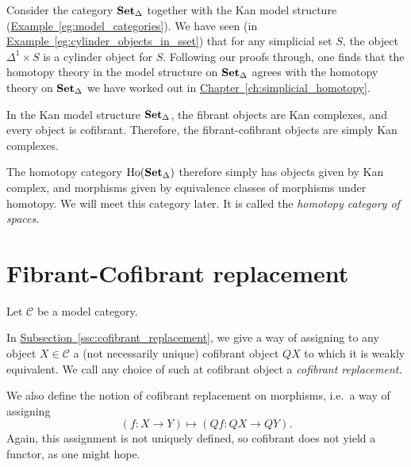 \documentclass[main.tex]{subfiles}
\begin{document}
\begin{example}
  Consider the category $\operatorname{\mathbf{Set}_{\Delta}}$ together with the Kan model structure (\hyperref[eg:model_categories]{Example~\ref*{eg:model_categories}}). We have seen (in \hyperref[eg:cylinder_objects_in_sset]{Example~\ref*{eg:cylinder_objects_in_sset}}) that for any simplicial set $S$, the object $\Delta^{1} \times S$ is a cylinder object for $S$. Following our proofs through, one finds that the homotopy theory in the model structure on $\operatorname{\mathbf{Set}_{\Delta}}$ agrees with the homotopy theory on $\operatorname{\mathbf{Set}_{\Delta}}$ we have worked out in \hyperref[ch:simplicial_homotopy]{Chapter~\ref*{ch:simplicial_homotopy}}.

  In the Kan model structure $\operatorname{\mathbf{Set}_{\Delta}}$, the fibrant objects are Kan complexes, and every object is cofibrant. Therefore, the fibrant-cofibrant objects are simply Kan complexes.

  The homotopy category $\mathrm{Ho}(\operatorname{\mathbf{Set}_{\Delta}})$ therefore simply has objects given by Kan complex, and morphisms given by equivalence classes of morphisms under homotopy. We will meet this category later. It is called the \emph{homotopy category of spaces.}
\end{example}

\section{Fibrant-Cofibrant replacement}
\label{sec:fibrant_cofibrant_replacement}

Let $\mathcal{C}$ be a model category.

In \hyperref[ssc:cofibrant_replacement]{Subsection~\ref*{ssc:cofibrant_replacement}}, we give a way of assigning to any object $X \in \mathcal{C}$ a (not necessarily unique) cofibrant object $QX$ to which it is weakly equivalent. We call any choice of such at cofibrant object a \emph{cofibrant replacement.}

We also define the notion of cofibrant replacement on morphisms, i.e.\ a way of assigning
\begin{equation*}
  (f\colon X \to Y) \mapsto (Qf\colon QX \to QY).
\end{equation*}
Again, this assignment is not uniquely defined, so cofibrant does not yield a functor, as one might hope.
\end{document}
